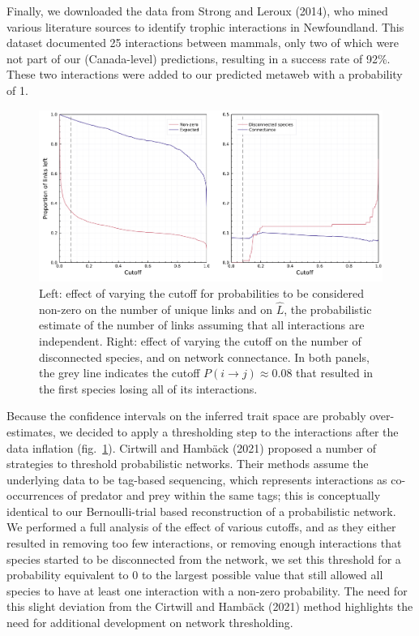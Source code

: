 \documentclass[11pt]{article}
\makeatletter
\def\maxwidth{\ifdim\Gin@nat@width>\linewidth\linewidth
\else\Gin@nat@width\fi}
\let\Oldincludegraphics\includegraphics
\renewcommand{\includegraphics}[1]{\Oldincludegraphics[width=\maxwidth]{#1}}
\makeatother
\begin{document}
Finally, we downloaded the data from Strong and Leroux (2014), who mined
various literature sources to identify trophic interactions in
Newfoundland. This dataset documented 25 interactions between mammals,
only two of which were not part of our (Canada-level) predictions,
resulting in a success rate of 92\%. These two interactions were added
to our predicted metaweb with a probability of 1.

\begin{figure}
\hypertarget{fig:thresholds}{%
\centering
\includegraphics{figures/figure-cutoffs.png}
\caption{Left: effect of varying the cutoff for probabilities to be
considered non-zero on the number of unique links and on \(\hat{L}\),
the probabilistic estimate of the number of links assuming that all
interactions are independent. Right: effect of varying the cutoff on the
number of disconnected species, and on network connectance. In both
panels, the grey line indicates the cutoff
\(P(i\rightarrow j) \approx 0.08\) that resulted in the first species
losing all of its interactions.}\label{fig:thresholds}
}
\end{figure}

Because the confidence intervals on the inferred trait space are
probably over-estimates, we decided to apply a thresholding step to the
interactions after the data inflation (fig.~\ref{fig:thresholds}).
Cirtwill and Hambäck (2021) proposed a number of strategies to threshold
probabilistic networks. Their methods assume the underlying data to be
tag-based sequencing, which represents interactions as co-occurrences of
predator and prey within the same tags; this is conceptually identical
to our Bernoulli-trial based reconstruction of a probabilistic network.
We performed a full analysis of the effect of various cutoffs, and as
they either resulted in removing too few interactions, or removing
enough interactions that species started to be disconnected from the
network, we set this threshold for a probability equivalent to 0 to the
largest possible value that still allowed all species to have at least
one interaction with a non-zero probability. The need for this slight
deviation from the Cirtwill and Hambäck (2021) method highlights the
need for additional development on network thresholding.
\end{document}
